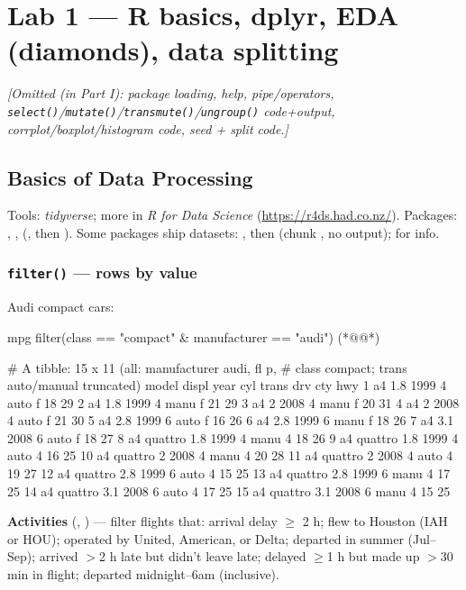 \section{Lab 1 --- R basics, dplyr, EDA (diamonds), data splitting}
{\color{figgray}\itshape [Omitted (in Part I): package loading, help, pipe/operators, \texttt{select()}/\texttt{mutate()}/\texttt{transmute()}/\texttt{ungroup()} code+output, corrplot/boxplot/histogram code, seed + split code.]}
%

\subsection{Basics of Data Processing}
%
Tools: \emph{tidyverse}; more in \emph{R for Data Science} (\url{https://r4ds.had.co.nz/}). Packages: , ,  (, then ). Some packages ship datasets: , then  (chunk , no output);  for info.

\subsubsection{\texttt{filter()} --- rows by value}
%
Audi compact cars:
\begin{rcode}
mpg %
  filter(class == "compact" & manufacturer == "audi") (*@\ixch{==}@*)
\end{rcode}
\begin{routput}
# A tibble: 15 x 11  (all: manufacturer audi, fl p,
#   class compact; trans auto/manual truncated)
   model      displ year cyl trans drv cty hwy
 1 a4           1.8 1999   4 auto  f    18  29
 2 a4           1.8 1999   4 manu  f    21  29
 3 a4           2   2008   4 manu  f    20  31
 4 a4           2   2008   4 auto  f    21  30
 5 a4           2.8 1999   6 auto  f    16  26
 6 a4           2.8 1999   6 manu  f    18  26
 7 a4           3.1 2008   6 auto  f    18  27
 8 a4 quattro   1.8 1999   4 manu  4    18  26
 9 a4 quattro   1.8 1999   4 auto  4    16  25
10 a4 quattro   2   2008   4 manu  4    20  28
11 a4 quattro   2   2008   4 auto  4    19  27
12 a4 quattro   2.8 1999   6 auto  4    15  25
13 a4 quattro   2.8 1999   6 manu  4    17  25
14 a4 quattro   3.1 2008   6 auto  4    17  25
15 a4 quattro   3.1 2008   6 manu  4    15  25
\end{routput}
\textbf{Activities} (, ) --- filter flights that: arrival delay $\ge$ 2 h; flew to Houston (IAH or HOU); operated by United, American, or Delta; departed in summer (Jul--Sep); arrived $>$2 h late but didn't leave late; delayed $\ge$1 h but made up $>$30 min in flight; departed midnight--6am (inclusive).

